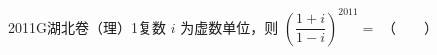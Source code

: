 
\begin{problem}{2011}{G}{湖北卷（理）}{1}{复数}
$i$ 为虚数单位，则 $\left(\dfrac{1+i}{1-i}\right)^{2011}=$ \hspace{1cm}（　　）
\begin{choices}
\end{choices}
\end{problem}

\begin{answer}

\end{answer}

\begin{solutions}

\end{solutions}